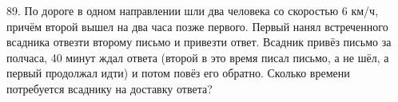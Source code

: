 89. По дороге в одном направлении шли два человека со скоростью 6 км/ч, причём второй вышел на два часа позже первого. Первый нанял встреченного всадника отвезти второму письмо и привезти ответ. Всадник привёз письмо за полчаса, 40 минут ждал ответа (второй в это время писал письмо, а не шёл, а первый продолжал идти) и потом повёз его обратно. Сколько времени потребуется всаднику на доставку ответа?\\
